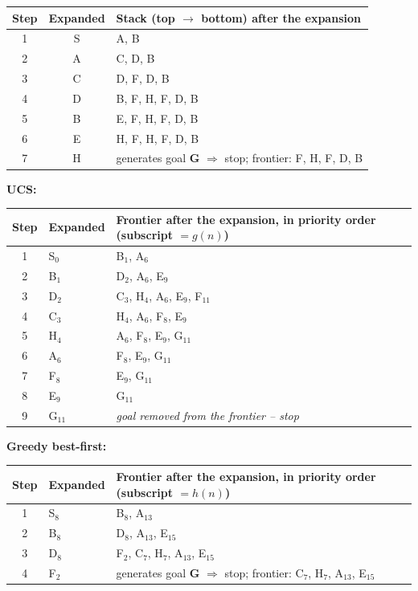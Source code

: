\documentclass[11pt,a4paper]{article}
\begin{document}
\begin{solbox}
\begin{center}
\begin{tabularx}{\linewidth}{c c >{\raggedright\arraybackslash}X}
Step & Expanded & Stack (top $\rightarrow$ bottom) after the expansion \\ \midrule
1 & S & A, B \\
2 & A & C, D, B \\
3 & C & D, F, D, B \\
4 & D & B, F, H, F, D, B \\
5 & B & E, F, H, F, D, B \\
6 & E & H, F, H, F, D, B \\
7 & H & generates goal \textbf{G} $\Rightarrow$ stop; frontier: F, H, F, D, B \\
\bottomrule\end{tabularx}\end{center}\textbf{UCS:}\begin{center}\small\begin{tabularx}{\linewidth}{c l >{\raggedright\arraybackslash}X}\toprule
Step & Expanded & Frontier after the expansion, in priority order (subscript $=g(n)$) \\ \midrule
1 & S$_{0}$ & B$_{1}$, A$_{6}$ \\
2 & B$_{1}$ & D$_{2}$, A$_{6}$, E$_{9}$ \\
3 & D$_{2}$ & C$_{3}$, H$_{4}$, A$_{6}$, E$_{9}$, F$_{11}$ \\
4 & C$_{3}$ & H$_{4}$, A$_{6}$, F$_{8}$, E$_{9}$ \\
5 & H$_{4}$ & A$_{6}$, F$_{8}$, E$_{9}$, G$_{11}$ \\
6 & A$_{6}$ & F$_{8}$, E$_{9}$, G$_{11}$ \\
7 & F$_{8}$ & E$_{9}$, G$_{11}$ \\
8 & E$_{9}$ & G$_{11}$ \\
9 & G$_{11}$ & \textit{goal removed from the frontier -- stop} \\
\bottomrule\end{tabularx}\end{center}\textbf{Greedy best-first:}\begin{center}\small\begin{tabularx}{\linewidth}{c l >{\raggedright\arraybackslash}X}\toprule
Step & Expanded & Frontier after the expansion, in priority order (subscript $=h(n)$) \\ \midrule
1 & S$_{8}$ & B$_{8}$, A$_{13}$ \\
2 & B$_{8}$ & D$_{8}$, A$_{13}$, E$_{15}$ \\
3 & D$_{8}$ & F$_{2}$, C$_{7}$, H$_{7}$, A$_{13}$, E$_{15}$ \\
4 & F$_{2}$ & generates goal \textbf{G} $\Rightarrow$ stop; frontier: C$_{7}$, H$_{7}$, A$_{13}$, E$_{15}$ \\

\end{tabularx}
\end{center}
\end{solbox}
\end{document}

